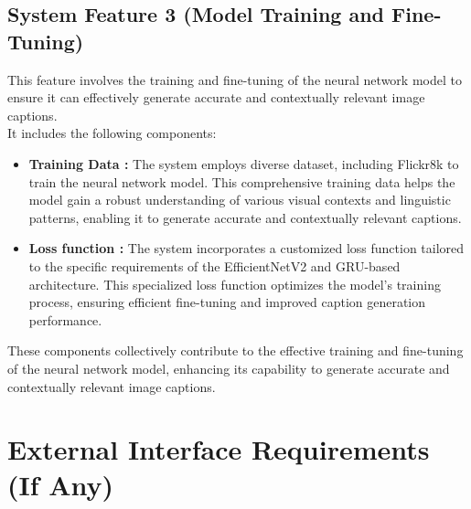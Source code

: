 \documentclass[oneside,a4paper,12pt]{report}
\begin{document}
\subsection{System Feature 3 (Model Training and Fine-Tuning)}
 This feature involves the training and fine-tuning of the neural network model to ensure it can effectively generate accurate and contextually relevant image captions. \\It includes the following components:
\begin{itemize}
\item \textbf{Training Data :} The system employs diverse dataset, including Flickr8k to train the neural network model. This comprehensive training data helps the model gain a robust understanding of various visual contexts and linguistic patterns, enabling it to generate accurate and contextually relevant captions.
\item \textbf{Loss function :} The system incorporates a customized loss function tailored to the specific requirements of the EfficientNetV2 and GRU-based architecture. This specialized loss function optimizes the model's training process, ensuring efficient fine-tuning and improved caption generation performance.
\end{itemize}
These components collectively contribute to the effective training and fine-tuning of the neural network model, enhancing its capability to generate accurate and contextually relevant image captions.


\section{External Interface Requirements (If Any)}
\end{document}
